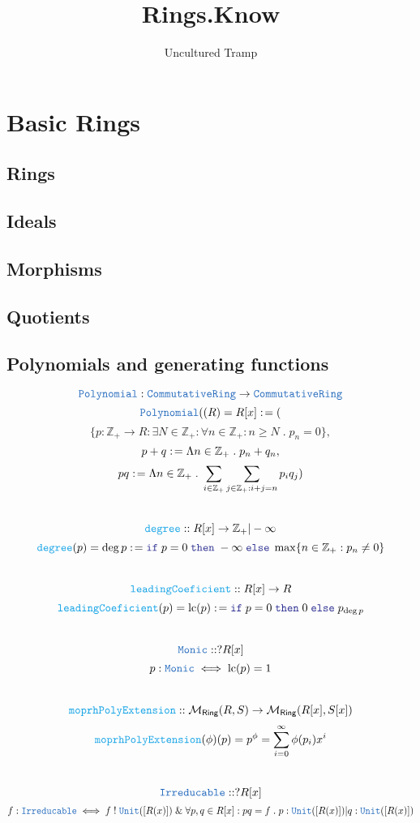 \documentclass[12pt]{article}
\author{Uncultured Tramp}
\title{Rings.Know}
\newcommand{\TYPE}[1]{\textcolor{NavyBlue}{\mathtt{#1}}}
\newcommand{\FUNC}[1]{\textcolor{Cerulean}{\mathtt{#1}}}
\newcommand{\LOGIC}[1]{\textcolor{Blue}{\mathtt{#1}}}
\renewcommand{\.}{\; . \;}
\newcommand{\de}{: \kern 0.1pc =}
\newcommand{\If}{\LOGIC{if} \;}
\newcommand{\Then}{ \; \LOGIC{then} \;}
\newcommand{\Else}{\; \LOGIC{else} \;}
\newcommand{\IsNot}{\; ! \;}
\newcommand{\NNInt}{\mathbb{Z}_{+} }
\renewcommand{\And}{\; \& \;}
\newcommand{\RING}{\mathsf{Ring}}
\newcommand{\CR}{\TYPE{CommutativeRing}}
\begin{document}
\maketitle
\begin{center}
\end{center}
\tableofcontents
\newpage
\section{Basic Rings}
\subsection{Rings}
\subsection{Ideals}
\subsection{Morphisms}
\subsection{Quotients}
\newpage
\subsection{Polynomials and generating functions}
$$\TYPE{Polynomial} :  \CR \to \CR$$
$$\TYPE{Polynomial}((R) = R[x] \de ( $$
$$ \{ p :  \NNInt \to R : \exists N \in \NNInt : \forall n \in \NNInt : n \ge N \. p_n = 0  \}, $$
$$ p + q \de \Lambda n \in \NNInt \. p_n + q_n,$$
$$  pq \de \Lambda n \in \NNInt \. \sum_{i \in \NNInt} \sum_{j \in \NNInt : i + j = n}  
p_iq_j )$$ 
\\
$$ \FUNC{degree} :: R[x] \to \NNInt | - \infty $$
$$\FUNC{degree}(p) = \deg p \de \If p = 0 \Then -\infty \Else  \max \{ n \in \NNInt : p_n \neq 0  \}  $$
\\
$$ \FUNC{leadingCoeficient} :: R[x] \to R $$
$$\FUNC{leadingCoeficient}(p) = \mathrm{lc}( p) \de \If p = 0 \Then 0 \Else  p_{\deg p} $$
\\
$$\TYPE{Monic} :: ?R[x] $$
$$ p : \TYPE{Monic} \iff \mathrm{lc}(p) = 1 $$
\\
$$ \FUNC{moprhPolyExtension} :: \mathcal{M}_{\RING}(R,S) \to \mathcal{M}_{\RING}(R[x],S[x]) $$
$$
 \FUNC{moprhPolyExtension}(\phi)(p)= p^\phi = \sum^\infty_{i=0} \phi(p_i)x^i 
$$
\\
$$\TYPE{Irreducable} :: ?R[x]$$
$$f : \TYPE{Irreducable}  \iff f \IsNot \TYPE{Unit}([R(x)]) \And \forall p,q \in R[x] :
pq =f \.  p : \TYPE{Unit}([R(x)]) | q :\TYPE{Unit}([R(x)])
$$
\\
\end{document}
